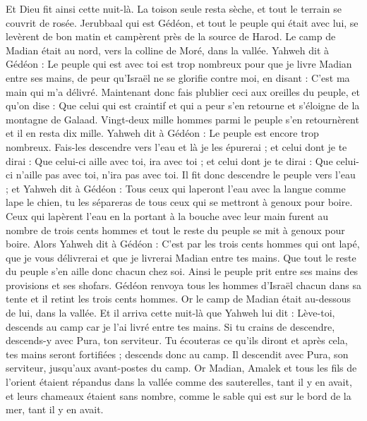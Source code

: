 \begin{multicols}{2}
Et Dieu fit ainsi cette nuit-là. La toison seule resta sèche, et tout le terrain se couvrit de rosée.
\VerseOne{}Jerubbaal qui est Gédéon, et tout le peuple qui était avec lui, se levèrent de bon matin et campèrent près de la source de Harod. Le camp de Madian était au nord, vers la colline de Moré, dans la vallée.
Yahweh dit à Gédéon : Le peuple qui est avec toi est trop nombreux pour que je livre Madian entre ses mains, de peur qu'Israël ne se glorifie contre moi, en disant : C'est ma main qui m'a délivré.
Maintenant donc fais plublier ceci aux oreilles du peuple, et qu'on dise : Que celui qui est craintif et qui a peur s'en retourne et s'éloigne de la montagne de Galaad. Vingt-deux mille hommes parmi le peuple s'en retournèrent et il en resta dix mille.
Yahweh dit à Gédéon : Le peuple est encore trop nombreux. Fais-les descendre vers l'eau et là je les épurerai ; et celui dont je te dirai : Que celui-ci aille avec toi, ira avec toi ; et celui dont je te dirai : Que celui-ci n'aille pas avec toi, n'ira pas avec toi.
Il fit donc descendre le peuple vers l'eau ; et Yahweh dit à Gédéon : Tous ceux qui laperont l'eau avec la langue comme lape le chien, tu les sépareras de tous ceux qui se mettront à genoux pour boire.
Ceux qui lapèrent l'eau en la portant à la bouche avec leur main furent au nombre de trois cents hommes et tout le reste du peuple se mit à genoux pour boire.
Alors Yahweh dit à Gédéon : C'est par les trois cents hommes qui ont lapé, que je vous délivrerai et que je livrerai Madian entre tes mains. Que tout le reste du peuple s'en aille donc chacun chez soi.
Ainsi le peuple prit entre ses mains des provisions et ses shofars. Gédéon renvoya tous les hommes d'Israël chacun dans sa tente et il retint les trois cents hommes. Or le camp de Madian était au-dessous de lui, dans la vallée.
Et il arriva cette nuit-là que Yahweh lui dit : Lève-toi, descends au camp car je l'ai livré entre tes mains.
Si tu crains de descendre, descends-y avec Pura, ton serviteur.
Tu écouteras ce qu'ils diront et après cela, tes mains seront fortifiées ; descends donc au camp. Il descendit avec Pura, son serviteur, jusqu'aux avant-postes du camp.
Or Madian, Amalek et tous les fils de l'orient étaient répandus dans la vallée comme des sauterelles, tant il y en avait, et leurs chameaux étaient sans nombre, comme le sable qui est sur le bord de la mer, tant il y en avait.

\end{multicols}
